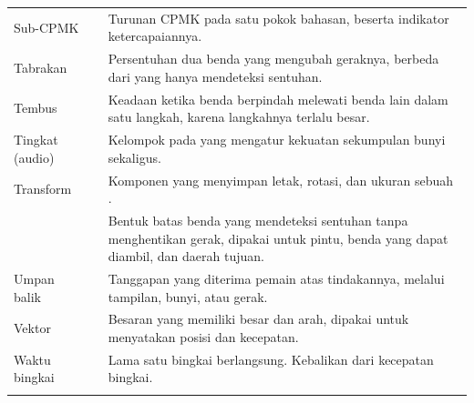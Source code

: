 \begin{longtable}{@{}L{3.9cm} L{3.6cm} L{7.2cm}@{}}
Sub-CPMK &  &
Turunan CPMK pada satu pokok bahasan, beserta indikator ketercapaiannya. \\
\addlinespace

Tabrakan &  &
Persentuhan dua benda yang mengubah geraknya, berbeda dari
 yang hanya mendeteksi sentuhan. \\ \addlinespace

Tembus &  &
Keadaan ketika benda berpindah melewati benda lain dalam satu langkah, karena
langkahnya terlalu besar. \\ \addlinespace

Tingkat (audio) &  &
Kelompok pada  yang mengatur kekuatan sekumpulan bunyi
sekaligus. \\ \addlinespace

Transform &  &
Komponen yang menyimpan letak, rotasi, dan ukuran sebuah
. \\ \addlinespace

 &  &
Bentuk batas benda yang mendeteksi sentuhan tanpa menghentikan gerak, dipakai
untuk pintu, benda yang dapat diambil, dan daerah tujuan. \\
\addlinespace

Umpan balik &  &
Tanggapan yang diterima pemain atas tindakannya, melalui tampilan, bunyi, atau
gerak. \\ \addlinespace

Vektor &  &
Besaran yang memiliki besar dan arah, dipakai untuk menyatakan posisi dan
kecepatan. \\ \addlinespace

Waktu bingkai &  &
Lama satu bingkai berlangsung. Kebalikan dari kecepatan bingkai. \\
\addlinespace

\end{longtable}
